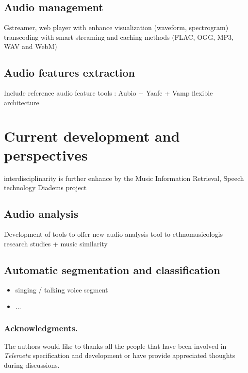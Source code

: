 \documentclass[runningheads,a4paper]{llncs}
\begin{document}
\subsection{Audio management}
Gstreamer, web player
with enhance visualization (waveform, spectrogram)
transcoding with smart streaming and caching methods (FLAC, OGG, MP3, WAV and WebM)

\subsection{Audio features extraction}
Include reference audio feature tools : Aubio + Yaafe + Vamp
\cite{yaafe_ISMIR2010,brossierPhD}
flexible architecture 

\section{Current development and perspectives}
interdisciplinarity is further enhance by the Music Information Retrieval, Speech technology 
Diadems project
\subsection{Audio analysis}
Development of tools  to offer new audio analysis tool to ethnomusicologis research studies 
+ music similarity

\subsection{Automatic segmentation and classification}
\begin{itemize}
\item singing / talking voice segment
\item ...
\end{itemize}


\subsubsection*{Acknowledgments.} 
The authors would like to thanks all the people that have been involved in \emph{Telemeta} specification and development or have provide appreciated thoughts during discussions.





\end{document}
